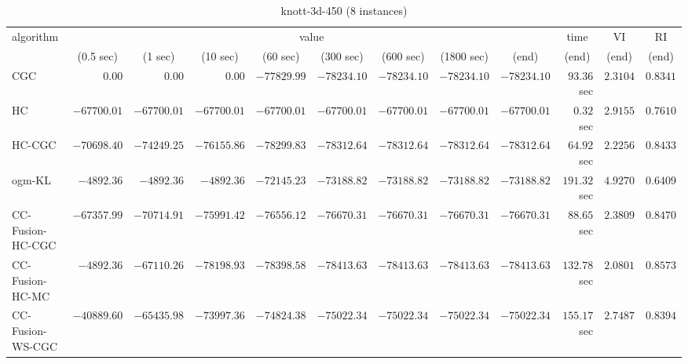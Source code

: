 \begin{table}[H]
\scriptsize
\centering
\caption{knott-3d-450 (8 instances)}
\label{tab:anytimetable-knott-3d-450}
\begin{tabular}{lrrrrrrrrrrr}
\toprule
           algorithm &                                   \multicolumn{8}{c}{value} & \multicolumn{1}{c}{time}    & \multicolumn{1}{c}{VI}  & \multicolumn{1}{c}{RI} \\  
\cmidrule(lr){2-9}\cmidrule(lr){10-10} \cmidrule(lr){11-11} \cmidrule(lr){12-12}   
                     & \multicolumn{1}{c}{(0.5 sec)} & \multicolumn{1}{c}{(1 sec)} & \multicolumn{1}{c}{(10 sec)} & \multicolumn{1}{c}{(60 sec)} & \multicolumn{1}{c}{(300 sec)} & \multicolumn{1}{c}{(600 sec)} & \multicolumn{1}{c}{(1800 sec)} & \multicolumn{1}{c}{(end)} & \multicolumn{1}{c}{(end)}    & \multicolumn{1}{c}{(end)}   & \multicolumn{1}{c}{(end)}  \\ \midrule 
                 CGC & $         0.00$ & $         0.00$ & $         0.00$ & $    -77829.99$ & $    -78234.10$ & $    -78234.10$ & $    -78234.10$ & $    -78234.10$ & $        93.36$ sec    & $       2.3104$  & $       0.8341$ \\ 
                  HC & $    -67700.01$ & $    -67700.01$ & $    -67700.01$ & $    -67700.01$ & $    -67700.01$ & $    -67700.01$ & $    -67700.01$ & $    -67700.01$ & $         0.32$ sec    & $       2.9155$  & $       0.7610$ \\ 
              HC-CGC & $    -70698.40$ & $    -74249.25$ & $    -76155.86$ & $    -78299.83$ & $    -78312.64$ & $    -78312.64$ & $    -78312.64$ & $    -78312.64$ & $        64.92$ sec    & $       2.2256$  & $       0.8433$ \\ 
              ogm-KL & $     -4892.36$ & $     -4892.36$ & $     -4892.36$ & $    -72145.23$ & $    -73188.82$ & $    -73188.82$ & $    -73188.82$ & $    -73188.82$ & $       191.32$ sec    & $       4.9270$  & $       0.6409$ \\ 
    CC-Fusion-HC-CGC & $    -67357.99$ & $    -70714.91$ & $    -75991.42$ & $    -76556.12$ & $    -76670.31$ & $    -76670.31$ & $    -76670.31$ & $    -76670.31$ & $        88.65$ sec    & $       2.3809$  & $       0.8470$ \\ 
     CC-Fusion-HC-MC & $     -4892.36$ & $    -67110.26$ & $    -78198.93$ & $    -78398.58$ & $    -78413.63$ & $    -78413.63$ & $    -78413.63$ & $    -78413.63$ & $       132.78$ sec    & $       2.0801$  & $       0.8573$ \\ 
    CC-Fusion-WS-CGC & $    -40889.60$ & $    -65435.98$ & $    -73997.36$ & $    -74824.38$ & $    -75022.34$ & $    -75022.34$ & $    -75022.34$ & $    -75022.34$ & $       155.17$ sec    & $       2.7487$  & $       0.8394$ \\ 

\end{tabular}
\end{table}
